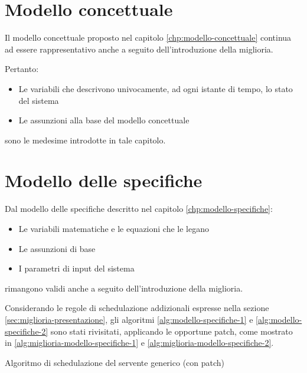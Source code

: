 \section{Modello concettuale}\label{sec:miglioria-modello-concettuale}
Il modello concettuale proposto nel capitolo \ref{chp:modello-concettuale} continua ad essere rappresentativo anche a seguito dell'introduzione della miglioria. 

Pertanto:
\begin{itemize}
\item Le variabili che descrivono univocamente, ad ogni istante di tempo, lo stato del sistema
\item Le assunzioni alla base del modello concettuale
\end{itemize}
sono le medesime introdotte in tale capitolo.
\section{Modello delle specifiche}\label{sec:miglioria-modello-specifiche}
Dal modello delle specifiche descritto nel capitolo \ref{chp:modello-specifiche}:
\begin{itemize}
\item Le variabili matematiche e le equazioni che le legano
\item Le assunzioni di base
\item I parametri di input del sistema
\end{itemize}
rimangono validi anche a seguito dell'introduzione della miglioria.

Considerando le regole di schedulazione addizionali espresse nella sezione \ref{sec:miglioria-presentazione}, gli algoritmi \ref{alg:modello-specifiche-1} e \ref{alg:modello-specifiche-2} sono stati rivisitati, applicando le opportune patch, come mostrato in \ref{alg:miglioria-modello-specifiche-1} e \ref{alg:miglioria-modello-specifiche-2}.

\begin{algorithm}[ht]
\SetAlgoLined
{}
\caption{Algoritmo di schedulazione del servente generico (con {\color{purple}patch})}
\label{alg:miglioria-modello-specifiche-1}
\end{algorithm}

